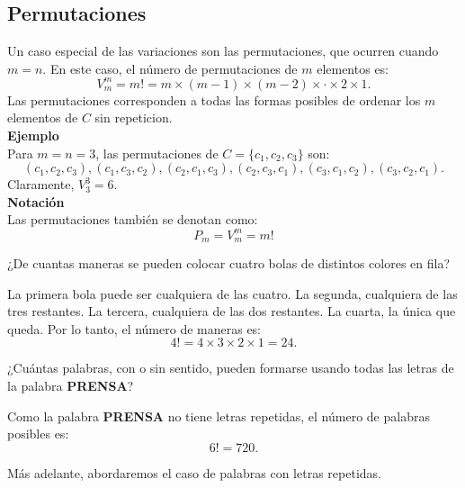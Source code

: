 \documentclass[12pt,a4paper]{book}
\begin{document}
    \subsection{Permutaciones}

    Un caso especial de las variaciones son las permutaciones, que ocurren cuando $m=n$.
    En este caso, el número de permutaciones de $m$ elementos es:
    \begin{equation*}
        V_{m}^{m}=m!=m\times(m-1)\times(m-2)\times\cdot\times2\times1.
    \end{equation*}
    Las permutaciones corresponden a todas las formas posibles de ordenar los $m$ elementos
    de $C$ sin repeticion.\\
    \textbf{Ejemplo}\\
    Para $m=n=3$, las permutaciones de $C=\{c_{1},c_{2},c_{3}\}$ son:
    \begin{equation*}
        (c_{1},c_{2},c_{3}),(c_{1},c_{3},c_{2}),(c_{2},c_{1},c_{3}),(c_{2},c_{3},c_{1}),(c_{3},c_{1},c_{2}),(c_{3},c_{2},c_{1}).
    \end{equation*}
    Claramente, $V_{3}^{3}=6$.\\
    \textbf{Notación}\\
    Las permutaciones también se denotan como:
    \begin{equation*}
        P_{m}=V_{m}^{m}=m!
    \end{equation*}
    
    \begin{mdframed}[style=mdgraybox,frametitle={Problema 18: Colocación de bolas}]
        ¿De cuantas maneras se pueden colocar cuatro bolas de distintos colores en fila?
    \end{mdframed}
    \begin{solucion}
        La primera bola puede ser cualquiera de las cuatro. La segunda, cualquiera de las
        tres restantes. La tercera, cualquiera de las dos restantes. La cuarta, la única
        que queda. Por lo tanto, el número de maneras es:
        \begin{equation*}
            4!=4\times3\times2\times1=24.
        \end{equation*}
    \end{solucion}

    \begin{mdframed}[style=mdgraybox,frametitle={Problema 19: Palabras con la palabra \textbf{PRENSA}}]
        ¿Cuántas palabras, con o sin sentido, pueden formarse usando todas las letras
        de la palabra \textbf{PRENSA}?
    \end{mdframed}
    \begin{solucion}
        Como la palabra \textbf{PRENSA} no tiene letras repetidas, el número de palabras
        posibles es:
        \begin{equation*}
            6!=720.
        \end{equation*}
    \end{solucion}
    Más adelante, abordaremos el caso de palabras con letras repetidas.
\end{document}
